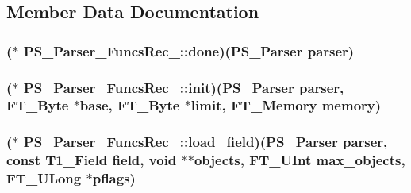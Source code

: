 \subsection{Member Data Documentation}
\hypertarget{struct_p_s___parser___funcs_rec___a9351f4dfa31c817d74c1a65741a71c8d}{
\subsubsection[{done}]{($\ast$ P\-S\-\_\-\-Parser\-\_\-\-Funcs\-Rec\-\_\-\-::done)({\bf P\-S\-\_\-\-Parser} parser)}}\label{struct_p_s___parser___funcs_rec___a9351f4dfa31c817d74c1a65741a71c8d}
\hypertarget{struct_p_s___parser___funcs_rec___ab85cca9562d53b5ee3142e0f5c1b8a9b}{
\subsubsection[{init}]{($\ast$ P\-S\-\_\-\-Parser\-\_\-\-Funcs\-Rec\-\_\-\-::init)({\bf P\-S\-\_\-\-Parser} parser, {\bf F\-T\-\_\-\-Byte} $\ast$base, {\bf F\-T\-\_\-\-Byte} $\ast${\bf limit}, {\bf F\-T\-\_\-\-Memory} memory)}}\label{struct_p_s___parser___funcs_rec___ab85cca9562d53b5ee3142e0f5c1b8a9b}
\hypertarget{struct_p_s___parser___funcs_rec___a1e3a763197f876746bc053bee27a3b86}{
\subsubsection[{load\-\_\-field}]{($\ast$ P\-S\-\_\-\-Parser\-\_\-\-Funcs\-Rec\-\_\-\-::load\-\_\-field)({\bf P\-S\-\_\-\-Parser} parser, const {\bf T1\-\_\-\-Field} field, {\bf void} $\ast$$\ast$objects, {\bf F\-T\-\_\-\-U\-Int} max\-\_\-objects, {\bf F\-T\-\_\-\-U\-Long} $\ast$pflags)}}\label{struct_p_s___parser___funcs_rec___a1e3a763197f876746bc053bee27a3b86}
